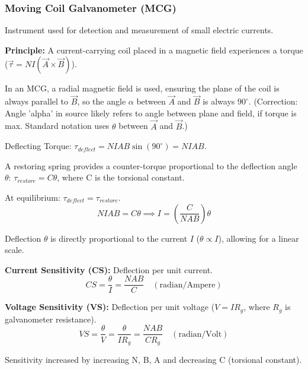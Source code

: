 \transfade[duration=0.5]

\begin{frame}[t]
    \frametitle{\textcolor{deepnavy}{\textbf{Moving Coil Galvanometer (MCG)}}}
    \renewcommand{\familydefault}{\rmdefault}
    \small

      \item<+-> Instrument used for detection and measurement of small electric currents.
      \item<+-> \textbf{Principle:} A current-carrying coil placed in a magnetic field experiences a torque ($\vec{\tau} = NI(\vec{A} \times \vec{B})$).

      \item<+-> In an MCG, a radial magnetic field is used, ensuring the plane of the coil is always parallel to $\vec{B}$, so the angle $\alpha$ between $\vec{A}$ and $\vec{B}$ is always $90^\circ$. (Correction: Angle 'alpha' in source likely refers to angle between plane and field, if torque is max. Standard notation uses $\theta$ between $\vec{A}$ and $\vec{B}$.)
      \item<+-> Deflecting Torque: $\tau_{deflect} = NIAB \sin(90^\circ) = NIAB$.
      \item<+-> A restoring spring provides a counter-torque proportional to the deflection angle $\theta$: $\tau_{restore} = C\theta$, where C is the torsional constant.
      \item<+-> At equilibrium: $\tau_{deflect} = \tau_{restore}$.
          \begin{equation*} NIAB = C\theta \implies I = \left(\frac{C}{NAB}\right) \theta \end{equation*}
      \item<+-> Deflection $\theta$ is directly proportional to the current $I$ ($\theta \propto I$), allowing for a linear scale.

      \item<+-> \textbf{Current Sensitivity (CS):} Deflection per unit current.
          \begin{equation*} CS = \frac{\theta}{I} = \frac{NAB}{C} \quad (\text{radian/Ampere}) \end{equation*}
      \item<+-> \textbf{Voltage Sensitivity (VS):} Deflection per unit voltage ($V=IR_g$, where $R_g$ is galvanometer resistance).
          \begin{equation*} VS = \frac{\theta}{V} = \frac{\theta}{IR_g} = \frac{NAB}{CR_g} \quad (\text{radian/Volt}) \end{equation*}
      \item<+-> Sensitivity increased by increasing N, B, A and decreasing C (torsional constant).
\end{frame}

